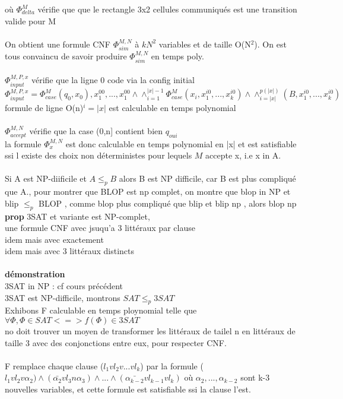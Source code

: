 \documentclass{article}
\begin{document}
  où $\Phi_{delta}^M$ vérifie que que le rectangle 3x2 cellules communiqués est une transition valide pour M\\\\On obtient une formule CNF $\Phi_{sim}^{M,N}$ à $kN^2$ variables et de taille O(N$^2$). On est tous convaincu de savoir produire $\Phi_{sim}^{M,N}$ en temps poly.\\\\
$\Phi_{input}^{M,P,x}$ vérifie que la ligne 0 code via la config initial\\
$\Phi_{input}^{M,P,x} = \Phi_{case}^M(q_0,x_0),x_1^{00},...,x_1^{00} \wedge \wedge_{i=1}^{|x|-1} \Phi_{case}^M(x_i,x_1^{i0},...,x_k^{i0}) \wedge \wedge_{i=|x|}^{p(|x|)} (B,x_1^{i0},...,x_k^{i0})$ formule de ligne O(n)$^i=|x|$ est calculable en temps polynomial\\\\

$\Phi_{accept}^{M,N}$ vérifie que la case (0,n] contient bien $q_{oui}$ \\
la formule $\Phi_x^{M,N}$ est donc calculable en temps polynomial en |x| et est satisfiable ssi l existe des choix non déterministes pour lequels $M$ accepte x, i.e x in A.
\paragraph{} 
Si A est NP-diificile et $A\leq_p B$ alors B est NP difficile, car B est plus compliqué que A., pour montrer que BLOP est np complet, on montre que blop in NP et blip $\leq_p$ BLOP , comme blop plus compliqué que blip et blip np , alors blop np\\\textbf{prop} 3SAT et variante est NP-complet, \\une formule CNF avec jsuqu'a 3 littéraux par clause\\ idem mais avec exactement\\idem mais avec 3 littéraux distincts\\\\\textbf{démonstration} \\3SAT in NP : cf cours précédent\\3SAT est NP-difficile, montrons $SAT \leq_p 3SAT$ \\Exhibons F calculable en temps ploynomial telle que \\$\forall \Phi, \Phi \in SAT <=> f(\Phi) \in 3SAT$\\no doit trouver un moyen de transformer les littéraux de tailel n en littéraux de taille 3 avec des conjonctions entre eux, pour respecter CNF.\\\\F remplace chaque clause ($l_1 v l_2v...vl_k$) par la formule ($l_1vl_2v\alpha_2) \wedge (\bar{\alpha_2}vl_3n\alpha_3)\wedge...\wedge(\bar{\alpha_{k-2}}vl_{k-1}vl_k)$ où $\alpha_2,...,\alpha_{k-2}$ sont k-3 nouvelles variables, et cette formule est satisfiable ssi la clause l'est.
\end{document}
